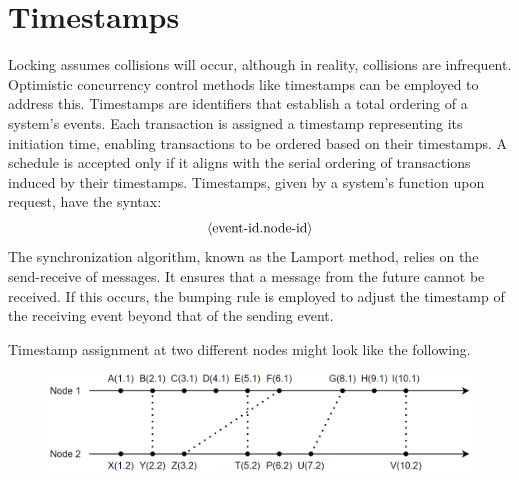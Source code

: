 \section{Timestamps}

Locking assumes collisions will occur, although in reality, collisions are infrequent.
Optimistic concurrency control methods like timestamps can be employed to address this. 
Timestamps are identifiers that establish a total ordering of a system's events. 
Each transaction is assigned a timestamp representing its initiation time, enabling transactions to be ordered based on their timestamps. 
A schedule is accepted only if it aligns with the serial ordering of transactions induced by their timestamps. 
Timestamps, given by a system's function upon request, have the syntax:
\[\left\langle \textnormal{event-id}.\textnormal{node-id} \right\rangle \]
The synchronization algorithm, known as the Lamport method, relies on the send-receive of messages. 
It ensures that a message from the future cannot be received. 
If this occurs, the bumping rule is employed to adjust the timestamp of the receiving event beyond that of the sending event.  
\begin{example}
    Timestamp assignment at two different nodes might look like the following.
    \begin{figure}[H]
        \centering
        \includegraphics[width=0.75\linewidth]{images/timestamps.png}
    \end{figure}
\end{example}

